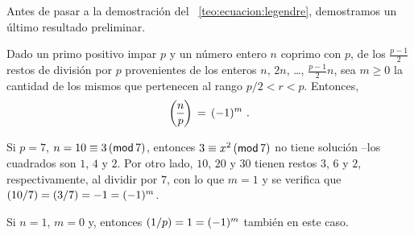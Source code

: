 Antes de pasar a la demostraci\'on del \teoname~\ref{teo:ecuacion:legendre},
demostramos un \'ultimo resultado preliminar.

\begin{lemaResiduos}\label{lema:residuos:gauss}
	Dado un primo positivo impar $p$ y un n\'umero entero $n$ coprimo
	con $p$, de los $\frac{p-1} 2$ restos de divisi\'on por $p$
	provenientes de los enteros $n$, $2n$, \dots, $\tfrac{p-1} 2 n$,
	sea $m\geq 0$ la cantidad de los mismos que pertenecen al rango
	$p/2<r<p$. Entonces,
	\begin{displaymath}
		\legendre n p\,=\,(-1)^m
		\text{ .}
	\end{displaymath}
\end{lemaResiduos}

\begin{ejemResiduos}\label{ejem:residuos:gauss}
	Si $p=7$, $n=10\equiv 3\tmodulo[7]$, entonces $3\equiv x^2\tmodulo[7]$
	no tiene soluci\'on --los cuadrados son $1$, $4$ y $2$. Por otro lado,
	$10$, $20$ y $30$ tienen restos $3$, $6$ y $2$, respectivamente, al
	dividir por $7$, con lo que $m=1$ y se verifica que
	$\tlegendre{10} 7=\tlegendre 3 7=-1=(-1)^m$.
\end{ejemResiduos}

\begin{ejemResiduos}\label{ejem:residuos:gauss:trivial}
	Si $n=1$, $m=0$ y, entonces $\tlegendre 1 p=1=(-1)^m$ tambi\'en
	en este caso.
\end{ejemResiduos}


